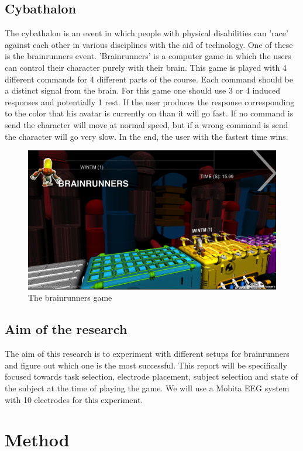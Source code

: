 \documentclass[12pt]{article}
\begin{document}
\subsection{Cybathalon}
The cybathalon is an event in which people with physical disabilities can 'race' against each other in various disciplines with the aid of technology. One of these is the brainrunners event. 'Brainrunners' is a computer game in which the users can control their character purely with their brain. This game is played with 4 different commands for 4 different parts of the course. Each command should be a distinct signal from the brain. For this game one should use 3 or 4 induced responses and potentially 1 rest. If the user produces the response corresponding to the color that his avatar is currently on than it will go fast. If no command is send the character will move at normal speed, but if a wrong command is send the character will go very slow. In the end, the user with the fastest time wins.
	\begin{figure}[h]
		\caption{The brainrunners game}
		\includegraphics[scale=0.3]{Brainrunners.png}
	\end{figure}

\subsection{Aim of the research}
The aim of this research is to experiment with different setups for brainrunners and figure out which one is the most successful. This report will be specifically focused towards task selection, electrode placement, subject selection and state of the subject at the time of playing the game. We will use a Mobita EEG system with 10 electrodes for this experiment. 

\section{Method}
\end{document}
